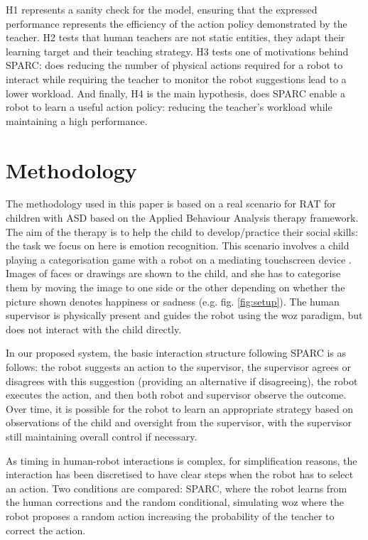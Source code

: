 H1 represents a sanity check for the model, ensuring that the expressed performance represents the efficiency of the action policy demonstrated by the teacher. H2 tests that human teachers are not static entities, they adapt their learning target and their teaching strategy. H3 tests one of motivations behind SPARC: does reducing the number of physical actions required for a robot to interact while requiring the teacher to monitor the robot suggestions lead to a lower workload. And finally, H4 is the main hypothesis, does SPARC enable a robot to learn a useful action policy: reducing the teacher's workload while maintaining a high performance.

\section{Methodology}
The methodology used in this paper is based on a real scenario for RAT for children with ASD based on the Applied Behaviour Analysis therapy framework.
The aim of the therapy is to help the child to develop/practice their social skills: the task we focus on here is emotion recognition. 
This scenario involves a child playing a categorisation game with a robot on a mediating touchscreen device \cite{baxter2012touchscreen}.
Images of faces or drawings are shown to the child, and she has to categorise them by moving the image to one side or the other depending on whether the picture shown denotes happiness or sadness (e.g. fig. \ref{fig:setup}). The human supervisor is physically present and guides the robot using the \acrlong{woz} paradigm, but does not interact with the child directly. 

In our proposed system, the basic interaction structure following SPARC is as follows: the robot suggests an action to the supervisor, the supervisor agrees or disagrees with this suggestion (providing an alternative if disagreeing), the robot executes the action, and then both robot and supervisor observe the outcome. Over time, it is possible for the robot to learn an appropriate strategy based on observations of the child and oversight from the supervisor, with the supervisor still maintaining overall control if necessary.

As timing in human-robot interactions is complex, for simplification reasons, the interaction has been discretised to have clear steps when the robot has to select an action. Two conditions are compared: SPARC, where the robot learns from the human corrections and the random conditional, simulating \gls{woz} where the robot proposes a random action increasing the probability of the teacher to correct the action. 

